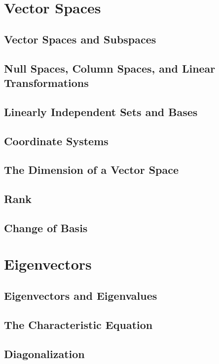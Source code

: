 \documentclass{package/notes}
\begin{document}
\chapter{Vector Spaces}

\section{Vector Spaces and Subspaces}

\section{Null Spaces, Column Spaces, and Linear Transformations}

\section{Linearly Independent Sets and Bases}

\section{Coordinate Systems}

\section{The Dimension of a Vector Space}

\section{Rank}

\section{Change of Basis}




\chapter{Eigenvectors}

\section{Eigenvectors and Eigenvalues}

\section{The Characteristic Equation}

\section{Diagonalization}
\end{document}
